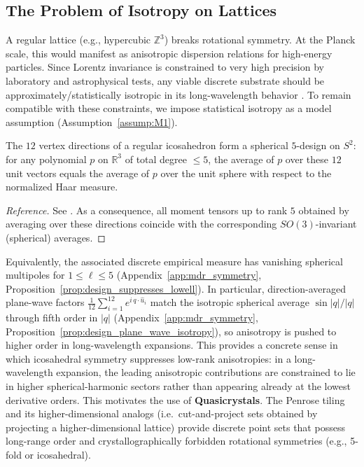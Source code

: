\subsection{The Problem of Isotropy on Lattices}
A regular lattice (e.g., hypercubic $\mathbb{Z}^3$) breaks rotational symmetry. At the Planck scale, this would manifest as anisotropic dispersion relations for high-energy particles. Since Lorentz invariance is constrained to very high precision by laboratory and astrophysical tests, any viable discrete substrate should be approximately/statistically isotropic in its long-wavelength behavior \cite{Mattingly2005,KosteleckyMewes2009}.
To remain compatible with these constraints, we impose statistical isotropy as a model assumption (Assumption~\ref{assump:M1}).
\begin{lemma}
\label{lemma:icosa_design}
The $12$ vertex directions of a regular icosahedron form a spherical $5$-design on $S^2$: for any polynomial $p$ on $\mathbb{R}^3$ of total degree $\le 5$, the average of $p$ over these $12$ unit vectors equals the average of $p$ over the unit sphere with respect to the normalized Haar measure.
\end{lemma}
\begin{proof}[Reference]
See \cite{DelsarteGoethalsSeidel1977}. As a consequence, all moment tensors up to rank $5$ obtained by averaging over these directions coincide with the corresponding $SO(3)$-invariant (spherical) averages.
\end{proof}
Equivalently, the associated discrete empirical measure has vanishing spherical multipoles for $1\le \ell\le 5$ (Appendix~\ref{app:mdr_symmetry}, Proposition~\ref{prop:design_suppresses_lowell}). In particular, direction-averaged plane-wave factors $\frac{1}{12}\sum_{i=1}^{12}e^{i\,q\cdot \hat u_i}$ match the isotropic spherical average $\sin|q|/|q|$ through fifth order in $|q|$ (Appendix~\ref{app:mdr_symmetry}, Proposition~\ref{prop:design_plane_wave_isotropy}), so anisotropy is pushed to higher order in long-wavelength expansions.
This provides a concrete sense in which icosahedral symmetry suppresses low-rank anisotropies: in a long-wavelength expansion, the leading anisotropic contributions are constrained to lie in higher spherical-harmonic sectors rather than appearing already at the lowest derivative orders.
This motivates the use of \textbf{Quasicrystals}. The Penrose tiling and its higher-dimensional analogs (i.e.\ cut-and-project sets obtained by projecting a higher-dimensional lattice) provide discrete point sets that possess long-range order and crystallographically forbidden rotational symmetries (e.g., 5-fold or icosahedral).
